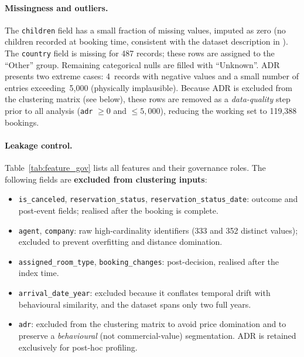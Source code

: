 \documentclass[12pt,a4paper]{article}
\begin{document}
\paragraph{Missingness and outliers.}
The \texttt{children} field has a small fraction of missing values, imputed
as zero (no children recorded at booking time, consistent with the dataset
description in \citet{antonio2019}).
The \texttt{country} field is missing for 487 records; these rows are
assigned to the ``Other'' group.
Remaining categorical nulls are filled with ``Unknown''.
ADR presents two extreme cases: 4~records with negative values and a
small number of entries exceeding~\EUR{}5,000 (physically implausible).
Because ADR is excluded from the clustering matrix (see below), these
rows are removed as a \emph{data-quality} step prior to all analysis
(\texttt{adr} $\geq 0$ and $\leq 5{,}000$), reducing the working set to
119,388 bookings.

\paragraph{Leakage control.}
Table~\ref{tab:feature_gov} lists all features and their governance roles.
The following fields are \textbf{excluded from clustering inputs}:

\begin{itemize}[noitemsep]
  \item \texttt{is\_canceled}, \texttt{reservation\_status},
        \texttt{reservation\_status\_date}: outcome and post-event
        fields; realised after the booking is complete.
  \item \texttt{agent}, \texttt{company}: raw high-cardinality
        identifiers (333 and 352 distinct values); excluded to prevent
        overfitting and distance domination.
  \item \texttt{assigned\_room\_type}, \texttt{booking\_changes}:
        post-decision, realised after the index time.
  \item \texttt{arrival\_date\_year}: excluded because it conflates
        temporal drift with behavioural similarity, and the dataset spans
        only two full years.
  \item \texttt{adr}: excluded from the clustering matrix to avoid
        price domination and to preserve a \emph{behavioural} (not
        commercial-value) segmentation. ADR is retained exclusively for
        post-hoc profiling.
\end{itemize}
\end{document}
